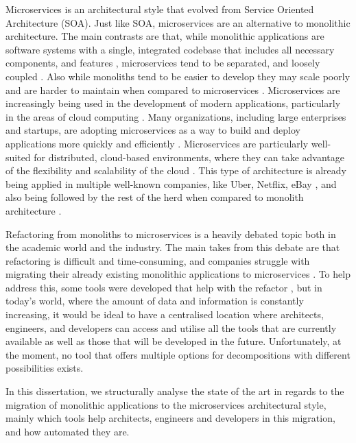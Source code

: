 Microservices is an architectural style that evolved from Service Oriented
Architecture (SOA). Just like SOA, microservices are an alternative to
monolithic architecture. The main contrasts are that, while monolithic
applications are software systems with a single, integrated codebase that
includes all necessary components, and features
\cite{kazanavivcius2019migrating}, microservices tend to be separated, and
loosely coupled \cite{newman2021building}. Also while monoliths tend to be
easier to develop they may scale poorly and are harder to maintain when
compared to microservices \cite{newman2019monolith}. Microservices are
increasingly being used in the development of modern applications, particularly
in the areas of cloud computing \cite{balalaie2016migrating}. Many
organizations, including large enterprises and startups, are adopting
microservices as a way to build and deploy applications more quickly and
efficiently \cite{richardson-microservices}. Microservices are particularly
well-suited for distributed, cloud-based environments, where they can take
advantage of the flexibility and scalability of the cloud
\cite{fowler-microservices-prerequisites}. This type of architecture is already
being applied in multiple well-known companies, like Uber, Netflix, eBay
\cite{microservices-users,ren2018migrating}, and also being followed by the
rest of the herd when compared to monolith architecture
\cite{taibi2017processes}.

Refactoring from monoliths to microservices is a heavily debated topic both in
the academic world and the industry. The main takes from this debate are that
refactoring is difficult and time-consuming, and companies struggle with
migrating their already existing monolithic applications to microservices
\cite{kamimura2018extracting}. To help address this, some tools were developed
that help with the refactor , but in today's world, where the
amount of data and information is constantly increasing, it would be ideal to
have a centralised location where architects, engineers, and developers can
access and utilise all the tools that are currently available as well as those
that will be developed in the future. Unfortunately, at the moment, no tool
that offers multiple options for decompositions with different possibilities
exists.

In this dissertation, we structurally analyse the state of the art in regards
to the migration of monolithic applications to the microservices architectural
style, mainly which tools help architects, engineers and developers in this
migration, and how automated they are.

